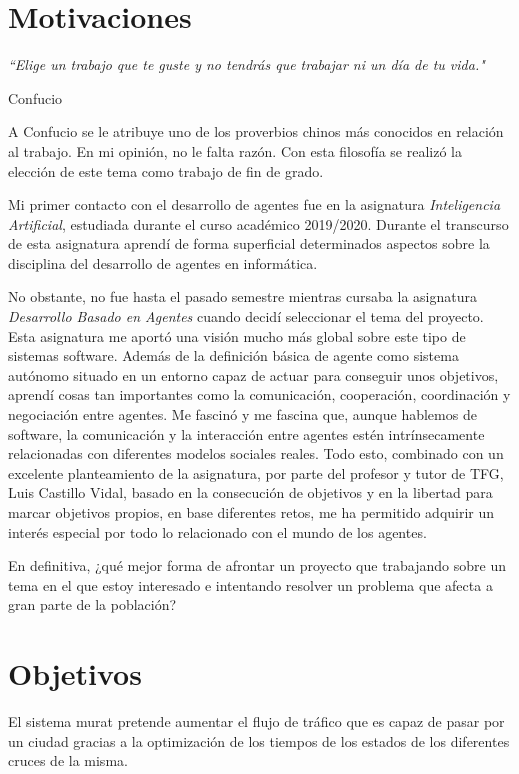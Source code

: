 \section{Motivaciones}
\epigraph{\textit{``Elige un trabajo que te guste y no tendrás que trabajar ni un día de tu vida."}}{Confucio}

A Confucio se le atribuye uno de los proverbios chinos más conocidos en relación al trabajo. En mi opinión, no le falta razón. Con esta filosofía se realizó la elección de este tema como trabajo de fin de grado.

Mi primer contacto con el desarrollo de agentes fue en la asignatura \textit{Inteligencia Artificial}, estudiada durante el curso académico 2019/2020. Durante el transcurso de esta asignatura aprendí de forma superficial determinados aspectos sobre la disciplina del desarrollo de agentes en informática.

No obstante, no fue hasta el pasado semestre mientras cursaba la asignatura \textit{Desarrollo Basado en Agentes} cuando decidí seleccionar el tema del proyecto. Esta asignatura me aportó una visión mucho más global sobre este tipo de sistemas software. Además de la definición básica de agente como sistema autónomo situado en un entorno capaz de actuar para conseguir unos objetivos, aprendí cosas tan importantes como la comunicación, cooperación, coordinación y negociación entre agentes. Me fascinó y me fascina que, aunque hablemos de software, la comunicación y la interacción entre agentes estén intrínsecamente relacionadas con diferentes modelos sociales reales. Todo esto, combinado con un excelente planteamiento de la asignatura, por parte del profesor y tutor de TFG, Luis Castillo Vidal, basado en la consecución de objetivos y en la libertad para marcar objetivos propios, en base diferentes retos, me ha permitido adquirir un interés especial por todo lo relacionado con el mundo de los agentes.
    
En definitiva, ¿qué mejor forma de afrontar un proyecto que trabajando sobre un tema en el que estoy interesado e intentando resolver un problema que afecta a gran parte de la población?

\section{Objetivos}
    \label{section:objetivos}
El sistema \acrshort{murat} pretende aumentar el flujo de tráfico que es capaz de pasar por un ciudad gracias a la optimización de los tiempos de los estados de los diferentes cruces de la misma.

